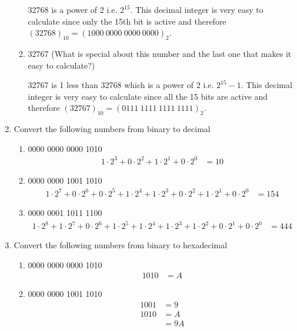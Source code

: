 \documentclass[12pt]{article}
\begin{document}
\begin{enumerate}
\begin{enumerate}
      32768 is a power of 2 i.e. $2^{15}$. This decimal integer is very easy to calculate since only the 15th bit is active and therefore $(32768)_{10} = (1000 \ 0000 \ 0000 \ 0000)_2$.

      \item 32767 (What is special about this number and the last one that makes it easy to calculate?)

      32767 is 1 less than 32768 which is a power of 2 i.e. $2^{15}-1$. This decimal integer is very easy to calculate since all the 15 bits are active and therefore $(32767)_{10} = (0111 \ 1111 \ 1111 \ 1111)_2$.

    \end{enumerate}

    \item Convert the following numbers from binary to decimal
    \begin{enumerate}
      \item 0000 0000 0000 1010
      \begin{align*}
        1 \cdot 2^3 + 0 \cdot 2^2 + 1 \cdot 2^1 + 0 \cdot 2^0 &= 10
      \end{align*}

      \item 0000 0000 1001 1010
      \begin{align*}
        1 \cdot 2^7 + 0 \cdot 2^6 + 0 \cdot 2^5 + 1 \cdot 2^4 + 1 \cdot 2^3 + 0 \cdot 2^2 + 1 \cdot 2^1 + 0 \cdot 2^0 &= 154
      \end{align*}

      \item 0000 0001 1011 1100
      \begin{align*}
        1 \cdot 2^8 + 1 \cdot 2^7 + 0 \cdot 2^6 + 1 \cdot 2^5 + 1 \cdot 2^4 + 1 \cdot 2^3 + 1 \cdot 2^2 + 0 \cdot 2^1 + 0 \cdot 2^0 &= 444
      \end{align*}

    \end{enumerate}

    \item Convert the following numbers from binary to hexadecimal
    \begin{enumerate}
      \item 0000 0000 0000 1010
      \begin{align*}
        1010 &= A
      \end{align*}

      \item 0000 0000 1001 1010
      \begin{align*}
        1001 &= 9 \\
        1010 &= A \\
        &= 9A
      \end{align*}


\end{enumerate}
\end{enumerate}
\end{document}
